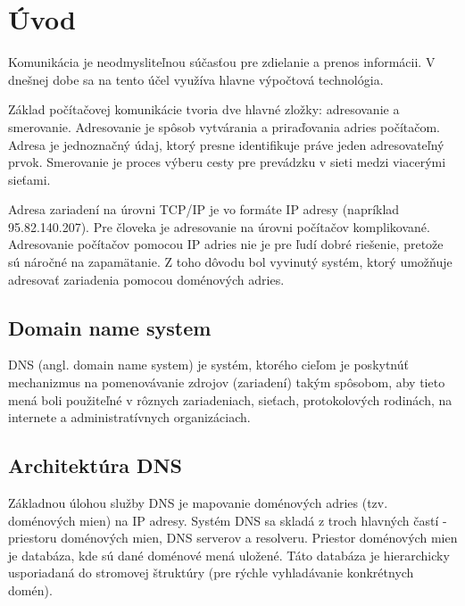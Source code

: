 
%


\newcommand*{\addNewChapter}[2][1]{\addtocounter{chapterCounter}{#1}\chapter{#2}\label{#2}}


\addNewChapter{Úvod}
Komunikácia je neodmysliteľnou súčasťou pre zdielanie a prenos informácii. V dnešnej dobe sa na tento účel využíva hlavne výpočtová technológia.

Základ počítačovej komunikácie tvoria dve hlavné zložky: adresovanie a smerovanie. Adresovanie je spôsob vytvárania a priraďovania adries počítačom. 
Adresa je jednoznačný údaj, ktorý presne identifikuje práve jeden adresovateľný prvok. Smerovanie je proces výberu cesty pre prevádzku v sieti medzi viacerými sieťami. \cite{Smerovanie}

Adresa zariadení na úrovni TCP/IP je vo formáte IP adresy (napríklad 95.82.140.207). 
Pre človeka je adresovanie na úrovni počítačov komplikované. Adresovanie počítačov pomocou IP adries nie je pre ľudí dobré riešenie, pretože sú náročné na zapamätanie.
Z toho dôvodu bol vyvinutý systém, ktorý umožňuje adresovať zariadenia pomocou doménových adries.

\section{Domain name system}
\label{Domain name system}
DNS (angl. domain name system) je systém, ktorého cieľom je poskytnúť mechanizmus na pomenovávanie
zdrojov (zariadení) takým spôsobom, aby tieto mená boli použiteľné v rôznych zariadeniach, sieťach, protokolových rodinách, 
na internete a administratívnych organizáciach. \cite{rfc1035} 

\section{Architektúra DNS}
Základnou úlohou služby DNS je mapovanie doménových adries (tzv. doménových mien) na IP adresy. 
Systém DNS sa skladá z troch hlavných častí - priestoru doménových mien, DNS serverov a resolveru. Priestor doménových mien je databáza, kde sú dané doménové mená uložené. 
Táto databáza je hierarchicky usporiadaná do stromovej štruktúry (pre rýchle vyhladávanie konkrétnych domén). \cite{Matoušek}

